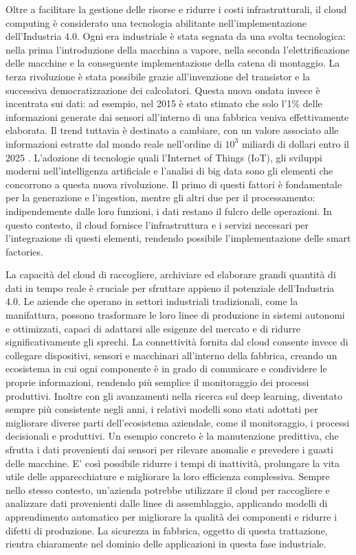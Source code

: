 Oltre a facilitare la gestione delle risorse e ridurre i costi infrastrutturali, il cloud computing è considerato una tecnologia abilitante nell'implementazione dell’Industria 4.0. Ogni era industriale è stata segnata da una svolta tecnologica: nella prima l'introduzione della macchina a vapore, nella seconda l'elettrificazione delle macchine e la conseguente implementazione della catena di montaggio. La terza rivoluzione è stata possibile grazie all'invenzione del transistor e la successiva democratizzazione dei calcolatori. Questa nuova ondata invece è incentrata sui dati: ad esempio, nel 2015 è stato stimato che solo l'1\% delle informazioni generate dai sensori all'interno di una fabbrica veniva effettivamente elaborata. Il trend tuttavia è destinato a cambiare, con un valore associato alle informazioni estratte dal mondo reale nell'ordine di $10^3$ miliardi di dollari entro il 2025 \cite{a6mckinsey}.  L’adozione di tecnologie quali l’Internet of Things (IoT), gli sviluppi moderni nell'intelligenza artificiale e l’analisi di big data sono gli elementi che concorrono a questa nuova rivoluzione. Il primo di questi fattori è fondamentale per la generazione e l'ingestion, mentre gli altri due per il processamento: indipendemente dalle loro funzioni, i dati restano il fulcro delle operazioni. In questo contesto, il cloud fornisce l'infrastruttura e i servizi necessari per l'integrazione di questi elementi, rendendo possibile l'implementazione delle smart factories. 

La capacità del cloud di raccogliere, archiviare ed elaborare grandi quantità di dati in tempo reale è cruciale per sfruttare appieno il potenziale dell’Industria 4.0. Le aziende che operano in settori industriali tradizionali, come la manifattura, possono trasformare le loro linee di produzione in sistemi autonomi e ottimizzati, capaci di adattarsi alle esigenze del mercato e di ridurre significativamente gli sprechi. La connettività fornita dal cloud consente invece di collegare dispositivi, sensori e macchinari all'interno della fabbrica, creando un ecosistema in cui ogni componente è in grado di comunicare e condividere le proprie informazioni, rendendo più semplice il monitoraggio dei processi produttivi. Inoltre con gli avanzamenti nella ricerca sul deep learning, diventato sempre più consistente negli anni, i relativi modelli sono stati adottati per migliorare diverse parti dell'ecosistema aziendale, come il monitoraggio, i processi decisionali e produttivi. Un esempio concreto è la manutenzione predittiva, che sfrutta i dati provenienti dai sensori per rilevare anomalie e prevedere i guasti delle macchine. E' così possibile ridurre i tempi di inattività, prolungare la vita utile delle apparecchiature e migliorare la loro efficienza complessiva. Sempre nello stesso contesto, un'azienda potrebbe utilizzare il cloud per raccogliere e analizzare dati provenienti dalle linee di assemblaggio, applicando modelli di apprendimento automatico per migliorare la qualità dei componenti e ridurre i difetti di produzione. La sicurezza in fabbrica, oggetto di questa trattazione, rientra chiaramente nel dominio delle applicazioni in questa fase industriale. 

